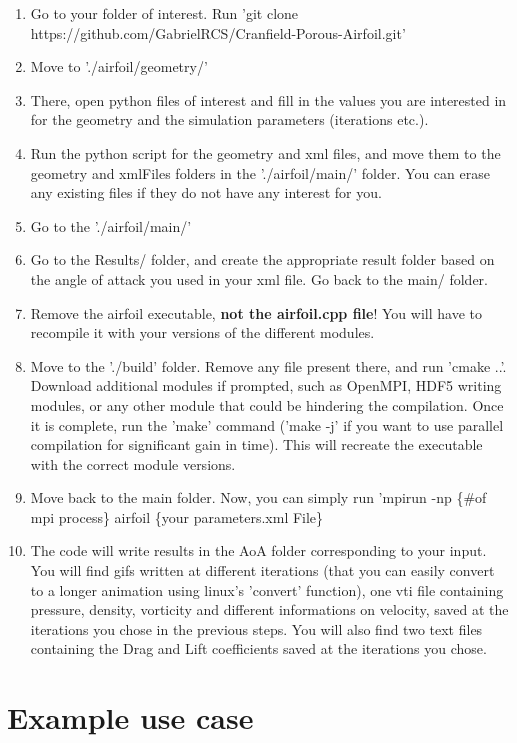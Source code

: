 \documentclass{article}
\begin{document}
\begin{enumerate}
    \item Go to your folder of interest. Run 'git clone https://github.com/GabrielRCS/Cranfield-Porous-Airfoil.git'
    \item Move to './airfoil/geometry/'
    \item There, open python files of interest and fill in the values you are interested in for the geometry and the simulation parameters (iterations etc.).
    \item Run the python script for the geometry and xml files, and move them to the geometry and xmlFiles folders in the './airfoil/main/' folder. You can erase any existing files if they do not have any interest for you.
    \item Go to the './airfoil/main/'
    \item Go to the Results/ folder, and create the appropriate result folder based on the angle of attack you used in your xml file. Go back to the main/ folder.
    \item Remove the airfoil executable, \textbf{not the airfoil.cpp file}! You will have to recompile it with your versions of the different modules.
    \item Move to the './build' folder. Remove any file present there, and run 'cmake ..'. Download additional modules if prompted, such as OpenMPI, HDF5 writing modules, or any other module that could be hindering the compilation. Once it is complete, run the 'make' command ('make -j' if you want to use parallel compilation for significant gain in time). This will recreate the executable with the correct module versions.
    \item Move back to the main folder. Now, you can simply run 'mpirun -np \{\#of mpi process\} airfoil \{your parameters.xml File\}
    \item The code will write results in the AoA folder corresponding to your input. You will find gifs written at different iterations (that you can easily convert to a longer animation using linux's 'convert' function), one vti file containing pressure, density, vorticity and different informations on velocity, saved at the iterations you chose in the previous steps. You will also find two text files containing the Drag and Lift coefficients saved at the iterations you chose. 
\end{enumerate}

\section{Example use case}
\end{document}
